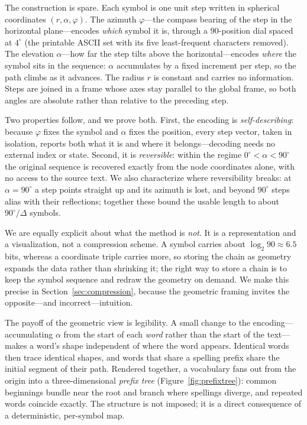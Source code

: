 \documentclass[11pt]{article}
\renewcommand{\deg}{^{\circ}}  %
\begin{document}
The construction is spare. Each symbol is one unit step written in spherical coordinates
$(r,\alpha,\varphi)$. The azimuth $\varphi$---the compass bearing of the step in the
horizontal plane---encodes \emph{which} symbol it is, through a $90$-position dial spaced at
$4\deg$ (the printable ASCII set with its five least-frequent characters removed). The
elevation $\alpha$---how far the step tilts above the horizontal---encodes \emph{where} the
symbol sits in the sequence: $\alpha$ accumulates by a fixed increment per step, so the path
climbs as it advances. The radius $r$ is constant and carries no information. Steps are
joined in a frame whose axes stay parallel to the global frame, so both angles are absolute
rather than relative to the preceding step.

Two properties follow, and we prove both. First, the encoding is \emph{self-describing}:
because $\varphi$ fixes the symbol and $\alpha$ fixes the position, every step vector, taken
in isolation, reports both what it is and where it belongs---decoding needs no external
index or state. Second, it is \emph{reversible}: within the regime $0\deg<\alpha<90\deg$ the
original sequence is recovered exactly from the node coordinates alone, with no access to
the source text. We also characterize where reversibility breaks: at $\alpha=90\deg$ a step
points straight up and its azimuth is lost, and beyond $90\deg$ steps alias with their
reflections; together these bound the usable length to about $90\deg/\Delta$ symbols.

We are equally explicit about what the method is \emph{not}. It is a representation and a
visualization, not a compression scheme. A symbol carries about $\log_2 90 \approx 6.5$
bits, whereas a coordinate triple carries more, so storing the chain as geometry expands the
data rather than shrinking it; the right way to store a chain is to keep the symbol sequence
and redraw the geometry on demand. We make this precise in Section~\ref{sec:compression},
because the geometric framing invites the opposite---and incorrect---intuition.

The payoff of the geometric view is legibility. A small change to the encoding---accumulating
$\alpha$ from the start of each \emph{word} rather than the start of the text---makes a
word's shape independent of where the word appears. Identical words then trace identical
shapes, and words that share a spelling prefix share the initial segment of their path.
Rendered together, a vocabulary fans out from the origin into a three-dimensional
\emph{prefix tree} (Figure~\ref{fig:prefixtree}): common beginnings bundle near the root and
branch where spellings diverge, and repeated words coincide exactly. The structure is not
imposed; it is a direct consequence of a deterministic, per-symbol map.
\end{document}
